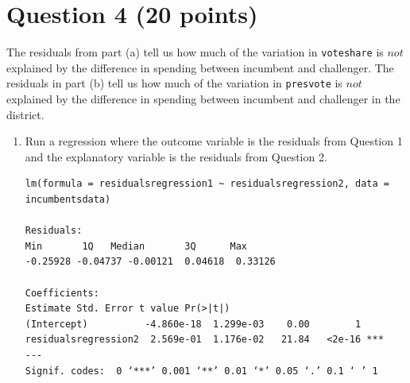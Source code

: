 \documentclass[12pt,letterpaper]{article}
\begin{document}
\newpage	
\section*{Question 4 (20 points)}
\noindent The residuals from part (a) tell us how much of the variation in \texttt{voteshare} is $not$ explained by the difference in spending between incumbent and challenger. The residuals in part (b) tell us how much of the variation in \texttt{presvote} is $not$ explained by the difference in spending between incumbent and challenger in the district.
	\begin{enumerate}
		\item Run a regression where the outcome variable is the residuals from Question 1 and the explanatory variable is the residuals from Question 2.
		
		\begin{Verbatim}
lm(formula = residualsregression1 ~ residualsregression2, data = incumbentsdata)

Residuals:
Min       1Q   Median       3Q      Max 
-0.25928 -0.04737 -0.00121  0.04618  0.33126 

Coefficients:
Estimate Std. Error t value Pr(>|t|)    
(Intercept)          -4.860e-18  1.299e-03    0.00        1    
residualsregression2  2.569e-01  1.176e-02   21.84   <2e-16 ***
---
Signif. codes:  0 ‘***’ 0.001 ‘**’ 0.01 ‘*’ 0.05 ‘.’ 0.1 ‘ ’ 1


\end{Verbatim}
\end{enumerate}
\end{document}

